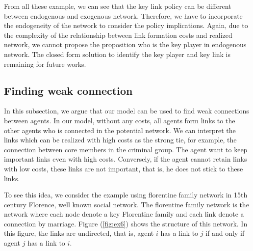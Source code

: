 \documentclass[12pt]{article}
\theoremstyle{definition}
\begin{document}
From all these example, we can see that the key link policy can be different between endogenous and exogenous network.
Therefore, we have to incorporate the endogeneity of the network to consider the policy implications.
Again, due to the complexity of the relationship between link formation costs and realized network, we cannot propose the proposition who is the key player in endogenous network.
The closed form solution to identify the key player and key link is remaining for future works.


\subsection{Finding weak connection}

In this subsection, we argue that our model can be used to find weak connections between agents.
In our model, without any costs, all agents form links to the other agents who is connected in the potential network.
We can interpret the links which can be realized with high costs as the strong tie, for example, the connection between core members in the criminal group.
The agent want to keep important links even with high costs.
Conversely, if the agent cannot retain links with low costs, these links are not important, that is, he does not stick to these links.

To see this idea, we consider the example using florentine family network in 15th century Florence, well known social network.
The florentine family network is the network where each node denote a key Florentine family and each link denote a connection by marriage.
Figure (\ref{fig:ex6}) shows the structure of this network.
In this figure, the links are undirected, that is, agent $i$ has a link to $j$ if and only if agent $j$ has a link to $i$.
\end{document}

